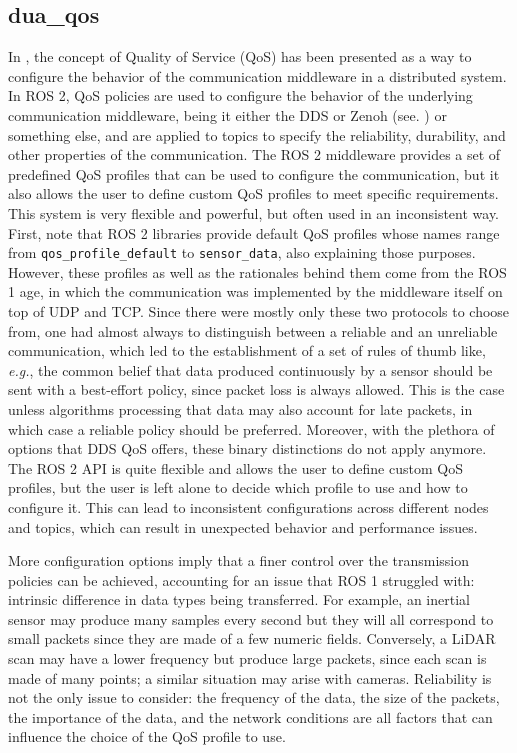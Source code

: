 \subsection{dua\_qos}
\label{sec:dua_qos}
In , the concept of Quality of Service (QoS) has been presented as a way to configure the behavior of the communication middleware in a distributed system. In ROS 2, QoS policies are used to configure the behavior of the underlying communication middleware, being it either the DDS or Zenoh (see. ) or something else, and are applied to topics to specify the reliability, durability, and other properties of the communication. The ROS 2 middleware provides a set of predefined QoS profiles that can be used to configure the communication, but it also allows the user to define custom QoS profiles to meet specific requirements. This system is very flexible and powerful, but often used in an inconsistent way. First, note that ROS 2 libraries provide default QoS profiles whose names range from \texttt{qos\_profile\_default} to \texttt{sensor\_data}, also explaining those purposes. However, these profiles as well as the rationales behind them come from the ROS 1 age, in which the communication was implemented by the middleware itself on top of UDP and TCP. Since there were mostly only these two protocols to choose from, one had almost always to distinguish between a reliable and an unreliable communication, which led to the establishment of a set of rules of thumb like, \emph{e.g.}, the common belief that data produced continuously by a sensor should be sent with a best-effort policy, since packet loss is always allowed. This is the case unless algorithms processing that data may also account for late packets, in which case a reliable policy should be preferred. Moreover, with the plethora of options that DDS QoS offers, these binary distinctions do not apply anymore. The ROS 2 API is quite flexible and allows the user to define custom QoS profiles, but the user is left alone to decide which profile to use and how to configure it. This can lead to inconsistent configurations across different nodes and topics, which can result in unexpected behavior and performance issues.

More configuration options imply that a finer control over the transmission policies can be achieved, accounting for an issue that ROS 1 struggled with: intrinsic difference in data types being transferred. For example, an inertial sensor may produce many samples every second but they will all correspond to small packets since they are made of a few numeric fields. Conversely, a LiDAR scan may have a lower frequency but produce large packets, since each scan is made of many points; a similar situation may arise with cameras. Reliability is not the only issue to consider: the frequency of the data, the size of the packets, the importance of the data, and the network conditions are all factors that can influence the choice of the QoS profile to use.

